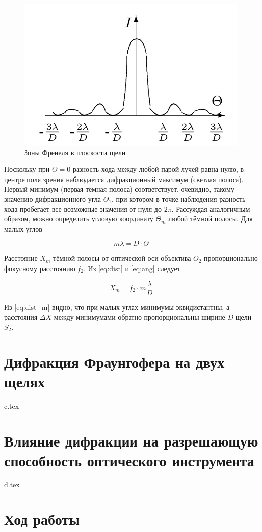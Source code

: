 \documentclass[a5paper,10pt, twoside]{article} %
\begin{document}
	\begin{figure} %
		\includegraphics[width=\linewidth]{dist.png}
		\caption{Зоны Френеля в	плоскости щели}
		\label{img:dist}
	\end{figure}

	Поскольку при $\Theta = 0$ разность хода между любой парой лучей равна нулю, в центре поля зрения
	наблюдается дифракционный максимум (светлая полоса). Первый минимум (первая тёмная полоса) 
	соответствует, очевидно, такому значению дифракционного угла $\Theta_1$, при котором
	в точке наблюдения разность хода пробегает все возможные значения от нуля до $2 \pi$.
	Рассуждая аналогичным образом, можно определить угловую координату $\Theta_m$
	любой тёмной полосы. Для малых углов

	\begin{equation}
		m \lambda = D \cdot \Theta
	\end{equation}\label{eq:ang}

	Расстояние $X_m$ тёмной полосы от оптической оси объектива $O_2$ пропорционально фокусному
	расстоянию $f_2$. Из \eqref{eq:dist} и \eqref{eq:ang} следует

	\begin{equation}
		X_m = f_2 \cdot m \frac{\lambda}{D}
	\end{equation}\label{eq:dist_m}

	Из \eqref{eq:dist_m} видно, что при малых углах минимумы эквидистантны, а расстояния $\Delta X$
	между минимумами обратно пропорциональны ширине $D$ щели $S_2$.

  \section{Дифракция Фраунгофера на двух щелях}
    {c.tex}

  \section{Влияние дифракции на разрешающую способность оптического инструмента}
    {d.tex}

\section{Ход работы}
\end{document}
